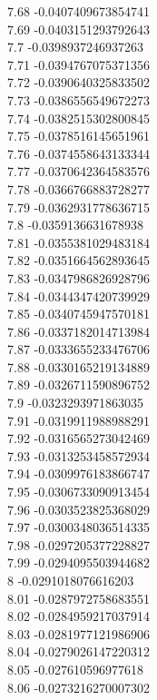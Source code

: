 {7.68	-0.0407409673854741\\
7.69	-0.0403151293792643\\
7.7	-0.0398937246937263\\
7.71	-0.0394767075371356\\
7.72	-0.0390640325833502\\
7.73	-0.0386556549672273\\
7.74	-0.0382515302800845\\
7.75	-0.0378516145651961\\
7.76	-0.0374558643133344\\
7.77	-0.0370642364583576\\
7.78	-0.0366766883728277\\
7.79	-0.0362931778636715\\
7.8	-0.0359136631678938\\
7.81	-0.0355381029483184\\
7.82	-0.0351664562893645\\
7.83	-0.0347986826928796\\
7.84	-0.0344347420739929\\
7.85	-0.0340745947570181\\
7.86	-0.0337182014713984\\
7.87	-0.0333655233476706\\
7.88	-0.0330165219134889\\
7.89	-0.0326711590896752\\
7.9	-0.0323293971863035\\
7.91	-0.0319911988988291\\
7.92	-0.0316565273042469\\
7.93	-0.0313253458572934\\
7.94	-0.0309976183866747\\
7.95	-0.0306733090913454\\
7.96	-0.0303523825368029\\
7.97	-0.0300348036514335\\
7.98	-0.0297205377228827\\
7.99	-0.0294095503944682\\
8	-0.0291018076616203\\
8.01	-0.0287972758683551\\
8.02	-0.0284959217037914\\
8.03	-0.0281977121986906\\
8.04	-0.0279026147220312\\
8.05	-0.027610596977618\\
8.06	-0.0273216270007302\\
}
